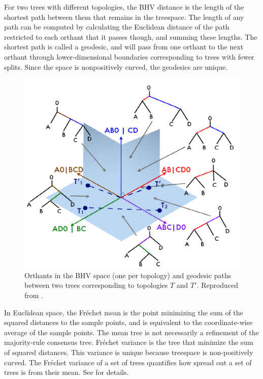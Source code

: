 For two trees with different topologies, the BHV distance is the length of the shortest path between them that remains in the treespace.  The length of any path can be computed by calculating the Euclidean distance of the path restricted to each orthant that it passes though, and summing these lengths.  The shortest path is called a geodesic, and will pass from one orthant to the next orthant through lower-dimensional boundaries corresponding to trees with fewer splits. Since the space is nonpositively  curved, the geodesics are unique.

\begin{figure}
 \includegraphics{Figs/OrthantBHV}
 \caption{Orthants in the BHV space (one per topology) and geodesic paths between two trees corresponding to topologies $T$ and $T'$. Reproduced from \citet{Billera2001}.}
\end{figure}

In Euclidean space, the Fr\'echet mean is the point minimizing the sum of the squared distances to the sample points, and is equivalent to the coordinate-wise average of the sample points. The mean tree is not necessarily a refinement of the majority-rule consensus tree. Fr\'echet variance is the tree that minimize the sum of squared distances.  This variance is unique because treespace is non-positively curved. The Fr\'echet variance of a set of trees quantifies how spread out a set of trees is from their mean. See \cite{miller2015polyhedral,brown2017mean} for details.

